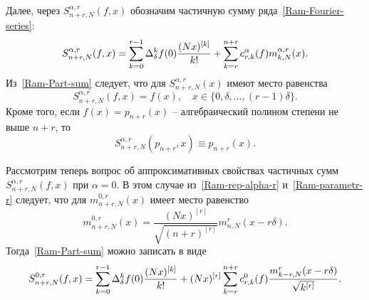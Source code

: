 Далее, через $S_{n+r,N}^{\alpha,r}(f,x)$ обозначим частичную сумму ряда~\eqref{Ram-Fourier-series}:
\begin{equation}\label{Ram-Part-sum}
S_{n+r,N}^{\alpha,r}(f,x)=\sum_{k=0}^{r-1}\Delta_\delta^kf(0){(Nx)^{[k]}\over k!}+\sum_{k=r}^{n+r} c^\alpha_{r,k}(f)m^{\alpha,r}_{k,N}(x).
\end{equation}
Из~\eqref{Ram-Part-sum} следует, что для $S_{n+r,N}^{\alpha,r}(x)$ имеют место равенства
\begin{equation*}
S_{n+r,N}^{\alpha,r}(f,x)=f(x), \quad x\in\{0, \delta, \ldots, (r-1)\delta\}.
\end{equation*}
Кроме того, если $f(x)=p_{n+r}(x)$ -- алгебраический полином степени не выше $n+r$, то
\begin{equation*}
S_{n+r,N}^{\alpha,r}(p_{n+r},x)\equiv p_{n+r}(x).
\end{equation*}

Рассмотрим теперь вопрос об аппроксимативных свойствах частичных сумм $S_{n+r,N}^{\alpha,r}(f,x)$ при $\alpha=0$. В этом случае из~\eqref{Ram-rep-alpha-r} и~\eqref{Ram-parametr-r} следует, что для $m_{n+r,N}^{0,r}(x)$ имеет место равенство
$$
m_{n+r,N}^{0,r}(x)=\frac{(Nx)^{[r]}}{\sqrt{(n+r)^{[r]}}}m_{n,N}^r(x-r\delta).
$$
Тогда~\eqref{Ram-Part-sum} можно записать в виде
\begin{equation*}
S_{n+r,N}^{0,r}(f,x)=\sum_{k=0}^{r-1}\Delta_\delta^kf(0){(Nx)^{[k]}\over k!}+(Nx)^{[r]}\sum_{k=r}^{n+r} c^0_{r,k}(f)\frac{m^{r}_{k-r,N}(x-r\delta)}{\sqrt{k^{[r]}}}.
\end{equation*}

